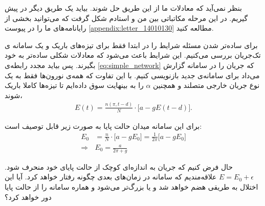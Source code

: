 
بنظر نمی‌آید که معادلات ما از این طریق حل شوند. بیاید یک طریق دیگر در پیش گیریم. در این مرحله مکاتباتی بین من و استادم شکل گرفت که می‌توانید بخشی از رایانامه‌های ما را در پیوست
\ref{appendix:letter_14010130}
مطالعه کنید.

برای ساده‌تر شدن مسئله شرایط را در ابتدا فقط برای تیزه‌های باریک و یک سامانه ی تک‌جریان بررسی می‌کنیم. این شرایط باعث می‌شود که معادلات شکلی ساده‌تر به خود بگیرند. پس بیاید مجدد رابطه‌ی 
\ref{eq:simple_network}
که جریان را در سامانه گزارش می‌داد برای سامانه‌ی جدید بازنویسی کنیم. با این تفاوت که همه‌ی نورون‌ها فقط به یک نوع جریان خارجی متصلند و همچنین $\alpha$ را به بینهایت سوق داده‌ایم تا تیزه‌ها کاملا باریک شوند،
\begin{align}
	E(t) = \frac{n(\pi,t-d)}{N} \cdot \big[ a - g E(t-d) \big] .
\end{align}

برای این سامانه میدان حالت پایا به صورت زیر قابل توصیف است:
\begin{align}
	E_0 &= \frac{n}{N} \cdot \big[ a - g E_0 \big] = \frac{1}{2\pi}\big[ a - g E_0 \big]\\
	\Rightarrow  & E_0 = \frac{a}{2\pi + g}
\end{align}

حال فرض کنیم که جریان به اندازه‌ای کوچک از حالت پایای خود منحرف ‌شود.
$E = E_0 + \epsilon$
علاقه‌مندیم که سامانه در زمان‌های بعدی چگونه رفتار خواهد کرد. آیا این اختلال به طریقی هضم خواهد شد و یا بزرگ‌تر می‌شود و هماره سامانه را از حالت پایا دور خواهد کرد؟

